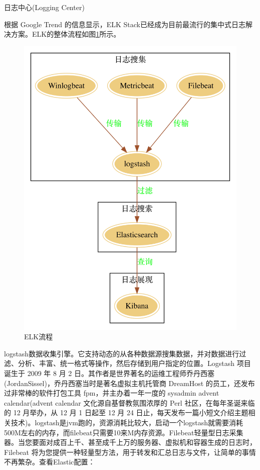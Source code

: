 \documentclass[8pt]{book}
\makeatletter
\numberwithin{dummy}{section}
\theoremstyle{ocrenumbox}
\theoremstyle{blacknumex}
\theoremstyle{blacknumbox}
\theoremstyle{ocrenum}
\renewcommand{\section}{\@startsection{section}{1}{\z@}
	{-4ex \@plus -1ex \@minus -.4ex}
	{1ex \@plus.2ex }
	{\normalfont\large\sffamily\bfseries}}
\makeatother
\begin{document}
\section{日志中心(Logging Center)}

根据 Google Trend 的信息显示，ELK Stack已经成为目前最流行的集中式日志解决方案。ELK的整体流程如图\ref{fig:elklogarchitecture}所示。




\begin{figure}[htbp]
	\centering
	\includegraphics[scale=0.05]{elk-log-architecture.jpg}
	\caption{ELK流程}
	\label{fig:elklogarchitecture}
\end{figure}
logstash数据收集引擎。它支持动态的从各种数据源搜集数据，并对数据进行过滤、分析、丰富、统一格式等操作，然后存储到用户指定的位置。Logstash 项目诞生于 2009 年 8 月 2 日。其作者是世界著名的运维工程师乔丹西塞(JordanSissel)，乔丹西塞当时是著名虚拟主机托管商 DreamHost 的员工，还发布过非常棒的软件打包工具 fpm，并主办着一年一度的 sysadmin advent calendar(advent calendar 文化源自基督教氛围浓厚的 Perl 社区，在每年圣诞来临的 12 月举办，从 12 月 1 日起至 12 月 24 日止，每天发布一篇小短文介绍主题相关技术)。logstash是jvm跑的，资源消耗比较大，启动一个logstash就需要消耗500M左右的内存，而filebeat只需要10来M内存资源。Filebeat轻量型日志采集器。当您要面对成百上千、甚至成千上万的服务器、虚拟机和容器生成的日志时，Filebeat 将为您提供一种轻量型方法，用于转发和汇总日志与文件，让简单的事情不再繁杂。查看Elastic配置：
\end{document}
